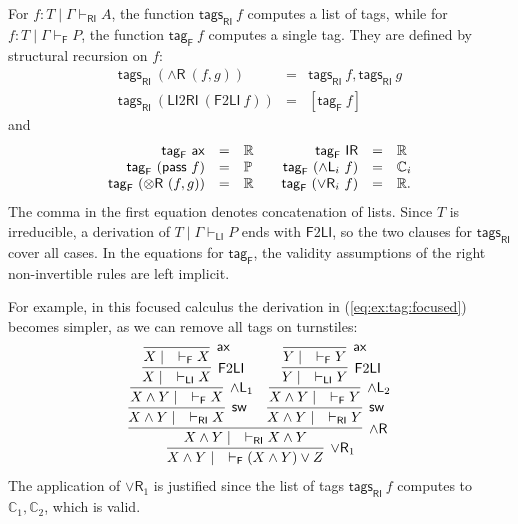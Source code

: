 \documentclass[submission,copyright,creativecommons]{eptcs}
\theoremstyle{definition}
\newcommand{\tr}{\otimes \mathsf{R}}
\newcommand{\pass}{\mathsf{pass}}
\newcommand{\unitr}{\mathsf{IR}}
\newcommand{\andlone}{\land \mathsf{L}_{1}}
\newcommand{\andltwo}{\land \mathsf{L}_{2}}
\newcommand{\andli}{\land \mathsf{L}_{i}}
\newcommand{\andr}{\land \mathsf{R}}
\newcommand{\orrone}{\lor \mathsf{R}_{1}}
\newcommand{\orri}{\lor \mathsf{R}_{i}}
\newcommand{\ax}{\mathsf{ax}}
\newcommand{\RI}{\mathsf{RI}}
\newcommand{\LI}{\mathsf{LI}}
\newcommand{\F}{\mathsf{F}}
\newcommand{\sw}{\mathsf{sw}}
\newcommand{\tP}{\mathbb{P}}
\newcommand{\tCone}{\mathbb{C}_1}
\newcommand{\tCtwo}{\mathbb{C}_2}
\newcommand{\tE}{\mathbb{R}}
\begin{document}
For $f:T\mid\Gamma\vdash_\RI A$, the function $\mathsf{tags}_{\RI}\ f$ computes a list of tags, while for $f:T\mid\Gamma\vdash_\F P$, the function $\mathsf{tag}_{\F}\ f$ computes a single tag. They are defined by structural recursion on $f$:
\begin{displaymath}
  \begin{array}{rcl}
    \mathsf{tags}_{\RI}\ (\andr\ (f,g)) &=& \mathsf{tags}_{\RI}\ f,\mathsf{tags}_{\RI}\ g
    \\
    \mathsf{tags}_{\RI}\ (\LI 2 \RI\ (\F 2 \LI\ f)) &=& [\mathsf{tag}_{\F}\ f]
  \end{array}
\end{displaymath}
and
\begin{displaymath}
  \begin{array}{rcl@{\qquad}rcl}
    \mathsf{tag}_{\F}\ \ax &=& \tE
    &
    \mathsf{tag}_{\F}\ \unitr &=& \tE
    \\
    \mathsf{tag}_{\F}\ (\pass\ f) &=& \tP
    &
    \mathsf{tag}_{\F}\ (\andli\ f) &=& \mathbb{C}_i
    \\
    \mathsf{tag}_{\F}\ (\tr\ (f,g)) &=& \tE
    &
    \mathsf{tag}_{\F}\ (\orri\ f) &=& \tE.
  \end{array}
\end{displaymath}
The comma in the first equation denotes concatenation of lists. Since $T$ is irreducible, a derivation of $T\mid\Gamma\vdash_\LI P$ ends with $\F 2 \LI$, so the two clauses for $\mathsf{tags}_{\RI}$ cover all cases. In the equations for $\mathsf{tag}_{\F}$, the validity assumptions of the right non-invertible rules are left implicit.

For example, in this focused calculus the derivation in (\ref{eq:ex:tag:focused})  becomes simpler, as we can remove all tags on turnstiles:
\begin{displaymath}
  \begin{array}{c}
    \infer[\orrone]{X\land Y\mid\quad\vdash_\F (X\land Y)\lor Z}{
      \infer[\andr]{X\land Y\mid\quad\vdash_\RI X\land Y}{
        \infer[\sw]{X\land Y\mid\quad\vdash_\RI X}{
          \infer[\andlone]{X\land Y\mid\quad\vdash_\F X}{
            \infer[\F 2 \LI]{X\mid\quad\vdash_\LI X}{
              \infer[\ax]{X\mid\quad\vdash_\F X}{}
            }
          }
        }
        &
        \infer[\sw]{X\land Y\mid\quad\vdash_\RI Y}{
          \infer[\andltwo]{X\land Y\mid\quad\vdash_\F Y}{
            \infer[\F 2 \LI]{Y\mid\quad\vdash_\LI Y}{
              \infer[\ax]{Y\mid\quad\vdash_\F Y}{}
            }
          }
        }
      }
    }
  \end{array}
\end{displaymath}
The application of $\orrone$ is justified since the list of tags $\mathsf{tags}_{\RI}\ f$ computes to $\tCone,\tCtwo$, which is valid.
\end{document}
